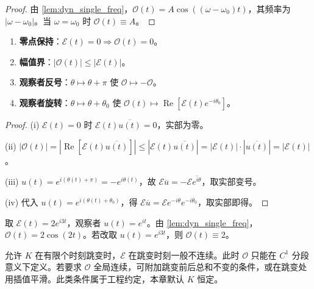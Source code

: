 \begin{proof}
由 \cref{lem:dyn_single_freq}，$\mathcal O(t)=A\cos((\omega-\omega_0)t)$，其频率为 $|\omega-\omega_0|$。当 $\omega=\omega_0$ 时 $\mathcal O(t)\equiv A$。
\end{proof}

\begin{property}[动态投影的基本性质]\label{prop:dyn_projection_properties}
\begin{enumerate}[label=(\roman*)]
    \item \textbf{零点保持}：$\mathcal E(t)=0\Rightarrow\mathcal O(t)=0$。
    \item \textbf{幅值界}：$|\mathcal O(t)|\le|\mathcal E(t)|$。
    \item \textbf{观察者反号}：$\theta\mapsto\theta+\pi$ 使 $\mathcal O\mapsto-\mathcal O$。
    \item \textbf{观察者旋转}：$\theta\mapsto\theta+\theta_0$ 使 $\mathcal O(t)\mapsto\operatorname{Re}[\mathcal E(t)e^{-i\theta_0}]$。
\end{enumerate}
\end{property}

\begin{proof}
(i) $\mathcal E(t)=0$ 时 $\mathcal E(t)\overline{u(t)}=0$，实部为零。

(ii) $|\mathcal O(t)|=|\operatorname{Re}[\mathcal E(t)\overline{u(t)}]|\le|\mathcal E(t)\overline{u(t)}|=|\mathcal E(t)|\cdot|\overline{u(t)}|=|\mathcal E(t)|$。

(iii) $u(t)=e^{i(\theta(t)+\pi)}=-e^{i\theta(t)}$，故 $\mathcal E\overline u=-\mathcal E\overline{e^{i\theta}}$，取实部变号。

(iv) 代入 $u(t)=e^{i(\theta(t)+\theta_0)}$，得 $\mathcal E\overline u=\mathcal E e^{-i\theta}e^{-i\theta_0}$，取实部即得。
\end{proof}

\begin{example}[动态投影的单频实例]\label{ex:dyn_single_freq_example}
取 $\mathcal E(t)=2e^{i3t}$，观察者 $u(t)=e^{it}$。由 \cref{lem:dyn_single_freq}，$\mathcal O(t)=2\cos(2t)$。若改取 $u(t)=e^{i3t}$，则 $\mathcal O(t)\equiv 2$。
\end{example}

\begin{remark}[$K$ 跳变的情形]\label{rem:dyn_K_jump}
允许 $K$ 在有限个时刻跳变时，$\mathcal E$ 在跳变时刻一般不连续。此时 $\mathcal O$ 只能在 $C^1$ 分段意义下定义。若要求 $\mathcal O$ 全局连续，可附加跳变前后总和不变的条件，或在跳变处用插值平滑。此类条件属于工程约定，本章默认 $K$ 恒定。
\end{remark}

